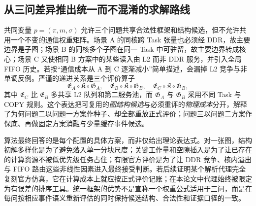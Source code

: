 \subsection{从三问差异推出统一而不混淆的求解路线}
共同变量 $p=(\pi,m,\sigma)$ 允许三个问题共享合法性框架和结构候选，但不允许共用一个不变的通信权重矩阵。场景 A 的同核跨 Task 张量也必须经 DDR，故主要边界是子图；场景 B 的同核多个子图在同一 Task 中可驻留，故主要边界转成核心；场景 C 又使相同 B 方案中的某些读入由 L2 而非 DDR 服务，并引入全局 FIFO 历史。若按“通信成本从 A 到 C 逐渐减小”简单描述，会漏掉 L2 竞争与非单调反例。严谨的递进关系是三个评价算子
\begin{equation}\label{eq:three-evaluators}
\mathfrak E_A\circ\mathfrak K\circ\mathfrak G_A,
\quad
\mathfrak E_B\circ\mathfrak K\circ\mathfrak G_B,
\quad
\mathfrak E_C\circ\mathfrak K\circ\mathfrak G_B,
\end{equation}
其中 $\mathfrak E_C$ 比 $\mathfrak E_B$ 多共享 L2 队列和第二服务池，而 $\mathfrak G_A$ 与 $\mathfrak G_B$ 采用不同 Task 与 COPY 规则。这个表达把可复用的\emph{图结构候选}与必须重评的\emph{物理成本}分开，解释了为何问题二以问题一方案作种子、却全部重放正式评价；问题三以问题二方案作保底、再做固定方案消融与少量缓存事件候选。

算法最终回答的是每个配置的具体方案，而非仅给出理论表达式。对一张图，结构初解多样化是为了避免落入单一分块尺度；关键工作量和空隙插入是为了让已存在的计算资源不被低优先级任务占住；有限官方评价是为了让 DDR 竞争、核内溢出与 FIFO 路由这些非线性因素进入最终接受判断。若后续证明某个解析代理完全复刻官方仿真，它在计算成本上就应按正式评价记账；在本论文中代理始终被限定为有误差的排序工具。统一框架的优势不是宣称一个权重公式适用于三问，而是在每问按相应事件语义重新评估的同时保持候选结构、合法性和证据口径的一致。
